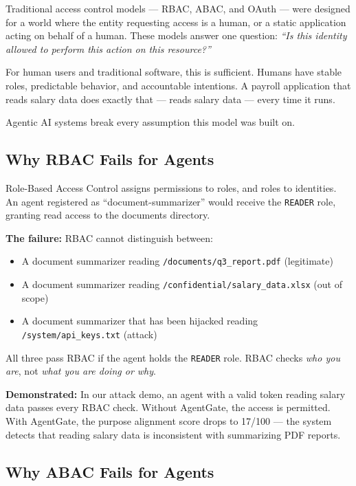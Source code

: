 \documentclass[12pt, a4paper]{article}
\begin{document}
Traditional access control models — RBAC, ABAC, and OAuth — were designed
for a world where the entity requesting access is a human, or a static
application acting on behalf of a human. These models answer one question:
\textit{``Is this identity allowed to perform this action on this resource?''}

For human users and traditional software, this is sufficient. Humans have
stable roles, predictable behavior, and accountable intentions. A payroll
application that reads salary data does exactly that — reads salary data —
every time it runs.

Agentic AI systems break every assumption this model was built on.

\subsection{Why RBAC Fails for Agents}

Role-Based Access Control assigns permissions to roles, and roles to identities.
An agent registered as ``document-summarizer'' would receive the
\texttt{READER} role, granting read access to the documents directory.

\textbf{The failure:} RBAC cannot distinguish between:
\begin{itemize}[noitemsep]
  \item A document summarizer reading \texttt{/documents/q3\_report.pdf} (legitimate)
  \item A document summarizer reading \texttt{/confidential/salary\_data.xlsx} (out of scope)
  \item A document summarizer that has been hijacked reading \texttt{/system/api\_keys.txt} (attack)
\end{itemize}

All three pass RBAC if the agent holds the \texttt{READER} role. RBAC checks
\textit{who you are}, not \textit{what you are doing or why}.

\textbf{Demonstrated:} In our attack demo, an agent with a valid token reading
salary data passes every RBAC check. Without AgentGate, the access is permitted.
With AgentGate, the purpose alignment score drops to 17/100 — the system
detects that reading salary data is inconsistent with summarizing PDF reports.

\subsection{Why ABAC Fails for Agents}
\end{document}
